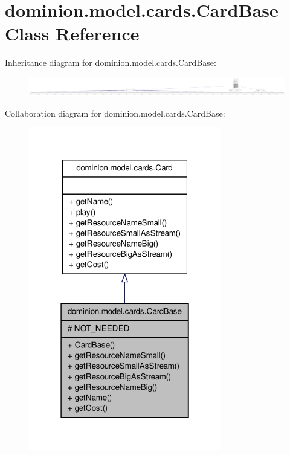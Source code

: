 \hypertarget{classdominion_1_1model_1_1cards_1_1CardBase}{\section{dominion.\-model.\-cards.\-Card\-Base \-Class \-Reference}
\label{classdominion_1_1model_1_1cards_1_1CardBase}
}


\-Inheritance diagram for dominion.\-model.\-cards.\-Card\-Base\-:
\nopagebreak
\begin{figure}[H]
\begin{center}
\leavevmode
\includegraphics[width=350pt]{classdominion_1_1model_1_1cards_1_1CardBase__inherit__graph}
\end{center}
\end{figure}


\-Collaboration diagram for dominion.\-model.\-cards.\-Card\-Base\-:
\nopagebreak
\begin{figure}[H]
\begin{center}
\leavevmode
\includegraphics[width=238pt]{classdominion_1_1model_1_1cards_1_1CardBase__coll__graph}
\end{center}
\end{figure}
